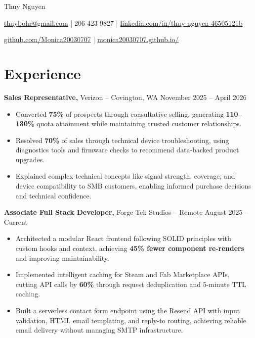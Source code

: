\documentclass[11pt]{article}       %
\begin{document}
\centerline{\Huge Thuy Nguyen}

\vspace{5pt}

\centerline{\href{mailto:thuybohr@gmail.com}{thuybohr@gmail.com} | 206-423-9827 |
\href{https://www.linkedin.com/in/thuy-nguyen-46505121b/}{linkedin.com/in/thuy-nguyen-46505121b}}

\centerline{\href{https://github.com/Monica20030707}{github.com/Monica20030707} | 
\href{https://monica20030707.github.io/}{monica20030707.github.io/}} 

\vspace{-9pt}

\section*{Experience}

\textbf{Sales Representative,} {Verizon} -- Covington, WA \hfill November 2025 -- April 2026 \\
\vspace{-9pt}
\begin{itemize}
  \item Converted \textbf{75\%} of prospects through consultative selling, generating \textbf{110--130\%} quota attainment while maintaining trusted customer relationships.
  \item Resolved \textbf{70\%} of sales through technical device troubleshooting, using diagnostics tools and firmware checks to recommend data-backed product upgrades.
  \item Explained complex technical concepts like signal strength, coverage, and device compatibility to SMB customers, enabling informed purchase decisions and technical confidence.
\end{itemize}

\textbf{Associate Full Stack Developer,} {Forge Tek Studios} -- Remote \hfill August 2025 -- Current \\
\vspace{-9pt}
\begin{itemize}
  \item Architected a modular React frontend following SOLID principles with custom hooks and context, achieving \textbf{45\% fewer component re-renders} and improving maintainability.
  \item Implemented intelligent caching for Steam and Fab Marketplace APIs, cutting API calls by \textbf{60\%} through request deduplication and 5-minute TTL caching.
  \item Built a serverless contact form endpoint using the Resend API with input validation, HTML email templating, and reply-to routing, achieving reliable email delivery without managing SMTP infrastructure.
\end{itemize}
\end{document}

